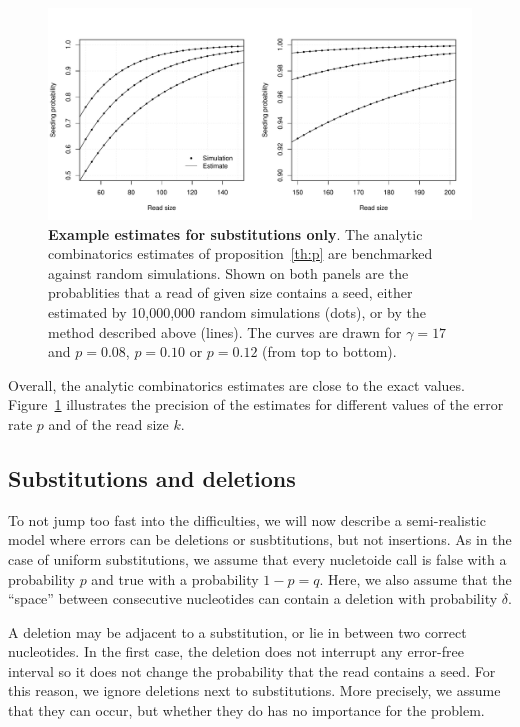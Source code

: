 \documentclass{article}
\begin{document}
\begin{figure}[h]
\centering
\includegraphics[scale=0.445]{simulp.pdf}
\caption{\textbf{Example estimates for substitutions only}. The analytic
combinatorics estimates of proposition~\ref{th:p} are benchmarked against
random simulations. Shown on both panels are the probablities that a read
of given size contains a seed, either estimated by 10,000,000 random
simulations (dots), or by the method described above (lines). The curves
are drawn for $\gamma=17$ and $p=0.08$, $p=0.10$ or $p=0.12$ (from top to
bottom).}
\label{fig:simulp}
\end{figure}

Overall, the analytic combinatorics estimates are close to the exact
values. Figure~\ref{fig:simulp} illustrates the precision of the estimates
for different values of the error rate $p$ and of the read size $k$.




\subsection{Substitutions and deletions}
\label{sec:deletions}

To not jump too fast into the difficulties, we will now describe a
semi-realistic model where errors can be deletions or susbtitutions, but
not insertions. As in the case of uniform substitutions, we assume that
every nucletoide call is false with a probability $p$ and true with a
probability $1-p=q$. Here, we also assume that the ``space''  between
consecutive nucleotides can contain a deletion with probability $\delta$.

A deletion may be adjacent to a substitution, or lie in between two
correct nucleotides. In the first case, the deletion does not interrupt
any error-free interval so it does not change the probability that the
read contains a seed. For this reason, we ignore deletions next to
substitutions. More precisely, we assume that they can occur, but whether
they do has no importance for the problem.
\end{document}
